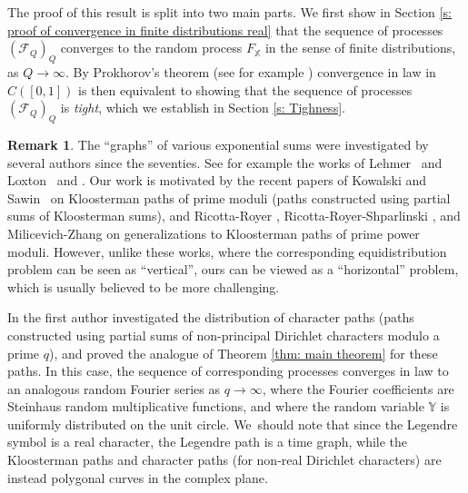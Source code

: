 \documentclass[JEP,XML,SOM,Unicode,NoFloatCountersInSection,published]{cedram}
\theoremstyle{plain}
\theoremstyle{definition}
\newtheorem{rem}[thm]{Remark}
\newcommand{\X}{\mathbb{X}}
\newcommand{\Y}{\mathbb{Y}}
\begin{document}
The proof of this result is split into two main parts. We first show in Section \ref{s: proof of convergence in finite distributions real} that the sequence of processes $(\mathcal{F}_Q)_Q$ converges to the random process $F_{\X}$ in the sense of finite distributions, as $Q\to \infty$. By Prokhorov's theorem (see for example \cite[Th.\,5.1]{Bi}) convergence in law in $C([0,1])$ is then equivalent to showing that the sequence of processes $(\mathcal{F}_Q)_Q$ is \emph{tight}, which we establish in Section \ref{s: Tighness}.

\begin{rem} The ``graphs'' of various exponential sums were investigated by several authors since the seventies. See for example the works of Lehmer~\cite{Le} and Loxton~\cite{Lo1} and \cite{Lo2}.
Our work is motivated by the recent papers of Kowalski and Sawin~\cite{KoSa} on Kloosterman paths of prime moduli (paths constructed using partial sums of Kloosterman sums), and Ricotta-Royer \cite{RiRo}, Ricotta-Royer-Shparlinski \cite{RiRoSh}, and Milicevich-Zhang \cite{MiZh} on generalizations to Kloosterman paths of prime power moduli. However, unlike these works, where the corresponding equidistribution problem can be seen as ``vertical'', ours can be viewed as a ``horizontal'' problem, which is usually believed to be more challenging.

In \cite{Hu} the first author investigated the distribution of character paths (paths constructed using partial sums of non-principal Dirichlet characters modulo a prime $q$), and proved the analogue of Theorem \ref{thm: main theorem} for these paths. In this case, the sequence of corresponding processes converges in law to an analogous random Fourier series as $q\to \infty$, where the Fourier coefficients are Steinhaus random multiplicative functions, and where the random variable $\Y$ is uniformly distributed on the unit circle. We~should note that since the Legendre symbol is a real character, the Legendre path is a time graph, while the Kloosterman paths and character paths (for non-real Dirichlet characters) are instead polygonal curves in the complex plane.
\end{rem}
\end{document}
